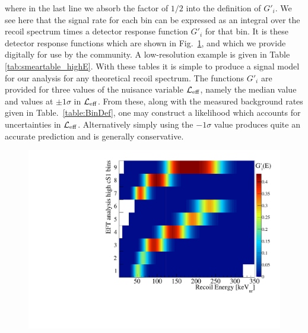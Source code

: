 %
where in the last line we absorb the factor of $1/2$ into the definition of $G'_i$. We see here that the signal rate for each bin can be expressed as an integral over the recoil spectrum times a detector response function $G'_i$ for that bin. It is these detector response functions which are shown in Fig.~\ref{fig:smeartable_highE}, and which we provide digitally for use by the community. A low-resolution example is given in Table \ref{tab:smeartable_highE}. With these tables it is simple to produce a signal model for our analysis for any theoretical recoil spectrum. The functions $G'_i$ are provided for three values of the nuisance variable $\mathcal{L}_{\mathrm{eff}}$, namely the median value and values at $\pm 1 \sigma$ in $\mathcal{L}_{\mathrm{eff}}$. From these, along with the measured background rates given in Table.~\ref{table:BinDef}, one may construct a likelihood which accounts for uncertainties in $\mathcal{L}_{\mathrm{eff}}$. Alternatively simply using the $-1\sigma$ value produces quite an accurate prediction and is generally conservative.

\begin{figure}[c]
\centerline{\includegraphics[width=0.5\linewidth]{smeartable_highE}}
\label{fig:smeartable_highE}
\end{figure}  

